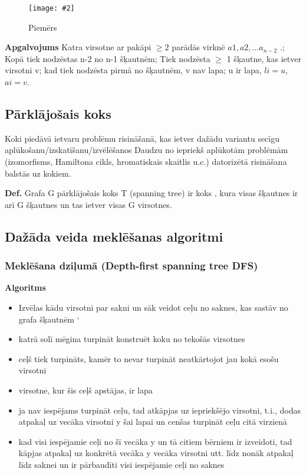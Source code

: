 \documentclass{article}
\newcommand{\illustration}[3]{
	\begin{figure}[H]
		\centering	
		\texttt{[image: \#2]}
		\caption{#3}
	\end{figure}
}
\begin{document}
\illustration{1}{Prufers_code-1}{Piemērs}

\textbf{Apgalvojums} Katra virsotne ar pakāpi $\ge 2$ parādās virknē $a1 , a2 , ...a_{n−2}$ .;  Kopā tiek nodzēstas n-2 no n-1 šķautnēm; Tiek nodzēsta $\ge$ 1 šķautne, kas ietver virsotni v; kad tiek nodzēsta pirmā no šķautnēm, v nav lapa; u ir lapa, $li = u$, $ai = v$.

\subsection{Pārklājošais koks}

Koki piedāvā ietvaru problēmu risināšanā, kas ietver dažādu variantu secīgu aplūkošanu/izskatīšanu/izvēlēšanos
Daudzu no iepriekš aplūkotām problēmām (izomorfisms, Hamiltona cikls, hromatiskais skaitlis u.c.) datorizētā risināšana balstās uz kokiem.


\textbf{Def.}  Grafa G pārklājošais koks T (spanning tree) ir koks , kura visas šķautnes ir arī G šķautnes un tas ietver visas G virsotnes.

\subsection{Dažāda veida meklēšanas algoritmi}

\subsubsection{Meklēšana dziļumā (Depth-first spanning tree DFS)}

\textbf{Algoritms}
\begin{itemize}
	\item Izvēlas kādu virsotni par sakni un sāk veidot ceļu no saknes, kas sastāv no grafa šķautnēm ‘
	\item katrā solī mēgina turpināt konstruēt koku no tekošās virsotnes
	\item ceļš tiek turpināts, kamēr to nevar turpināt neatkārtojot jau kokā esošu virsotni
	\item virsotne, kur šis ceļš apstājas, ir lapa
	\item ja nav iespējams turpināt ceļu, tad atkāpjas uz iepriekšējo virsotni, t.i., dodas atpakaļ uz vecāka virsotni y šai lapai un cenšas turpināt ceļu citā virzienā
	\item kad visi iespējamie ceļi no šī vecāka y un tā citiem bērniem ir izveidoti, tad kāpjas atpakaļ uz konkrētā vecāka y vecāka virsotni utt. līdz nonāk atpakaļ līdz saknei un ir pārbaudīti visi iespējamie ceļi no saknes
\end{itemize}
\end{document}
